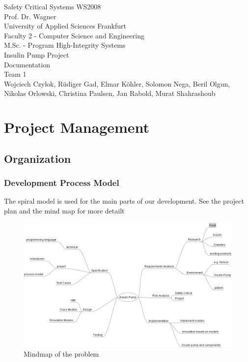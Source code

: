 \documentclass[pdflatex,a4paper,11pt,english]{scrreprt}
\begin{document}
\begin{titlepage}
\vspace*{4cm}
\begin{center}
\Large
Safety Critical Systems WS2008\\
Prof. Dr. Wagner\\
\vspace{4cm}
\normalsize
University of Applied Sciences Frankfurt\\
Faculty 2 - Computer Science and Engineering\\
M.Sc. - Program High-Integrity Systems\\
\vspace{2cm}
Insulin Pump Project\\
Documentation\\
Team 1\\
\vspace{2cm}
Wojciech Czylok, Rüdiger Gad, Elmar Köhler, Solomon Nega, Beril Olgun,\\
Nikolas Orlowski, Christina Paulsen, Jan Rabold, Murat Shahrashoub
\end{center}
\end{titlepage}

\tableofcontents

\listoffigures


\chapter{Project Management}
\section{Organization}
\subsection{Development Process Model}
The spiral model is used for the main parts of our development.
See the project plan and the mind map for more detailt

\begin{figure}[htb]
\centering
\includegraphics[width=\textwidth]{images/Insulin_Pump_Mindmap.png}
\caption{Mindmap of the problem}
\label{fig:mindmap}
\end{figure}
\end{document}
